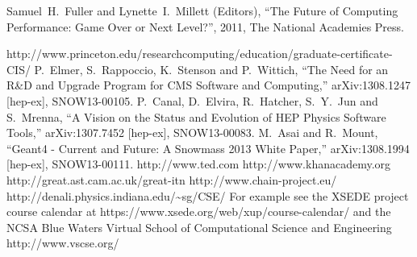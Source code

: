 \begin{thebibliography}{99}



 Samuel~H.~Fuller and Lynette~I.~Millett (Editors),
  ``The Future of Computing Performance:  Game Over or Next Level?'', 
  2011,
  The National Academies Press.

 http://www.princeton.edu/researchcomputing/education/graduate-certificate-CIS/
 P.~Elmer, S.~Rappoccio, K.~Stenson and P.~Wittich, 
  ``The Need for an R\&D and Upgrade Program for CMS Software and Computing,'' 
  arXiv:1308.1247 [hep-ex], SNOW13-00105.
  P.~Canal, D.~Elvira, R.~Hatcher, S.~Y.~Jun and S.~Mrenna,
  ``A Vision on the Status and Evolution of HEP Physics Software Tools,''
  arXiv:1307.7452 [hep-ex], SNOW13-00083.
 M.~Asai and R.~Mount, 
   ``Geant4 - Current and Future: A Snowmass 2013 White Paper,''
  arXiv:1308.1994 [hep-ex], SNOW13-00111.
 http://www.ted.com
 http://www.khanacademy.org
 http://great.ast.cam.ac.uk/great-itn
 http://www.chain-project.eu/
 http://denali.physics.indiana.edu/{\textasciitilde{}}sg/CSE/ 
 For example see the XSEDE project course calendar at https://www.xsede.org/web/xup/course-calendar/ and the NCSA Blue Waters Virtual School of Computational Science and Engineering http://www.vscse.org/ 


\end{thebibliography}
















